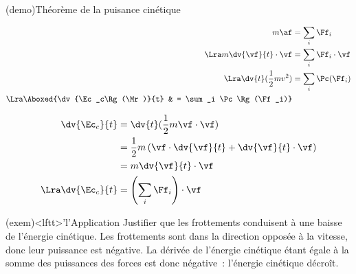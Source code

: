 \documentclass[../../main/main.tex]{subfiles}
\begin{document}
\begin{tcb}[sidebyside](demo){Théorème de la puisance cinétique}
	\begin{center}
	\end{center}
	\vspace*{-15pt}
	\begin{align*}
		m\af                          & = \sum_i \Ff_i
		\\\Lra
		m \dv{\vf}{t}\cdot\vf         & = \sum_i \Ff_i\cdot\vf
		\\\Lra
		\dv{t}(\frac{1}{2}mv^2)       & = \sum_i \Pc(\Ff_i)
		\\\Lra
		\Aboxed{\dv{\Ec_c\Rg(\Mr)}{t} & = \sum_i \Pc\Rg(\Ff_i)}
	\end{align*}
	\tcblower
	\begin{center}
	\end{center}
	\vspace*{-15pt}
	\begin{align*}
		\dv{\Ec_c}{t} & = \dv{t}(\frac{1}{2}m\vf\cdot\vf)
		\\
		              & = \frac{1}{2}m \left( \vf\cdot \dv{\vf}{t} + \dv{\vf}{t}
		\cdot \vf\right)
		\\
		              & = m\dv{\vf}{t}\cdot\vf
		\\\Lra
		\dv{\Ec_c}{t} & = \left( \sum_i \Ff_i \right)\cdot\vf
	\end{align*}
\end{tcb}


\begin{tcb*}(exem)<lftt>'l'{Application}
	Justifier que les frottements conduisent à une baisse de l'énergie
	cinétique.
	\tcblower
	Les frottements sont dans la direction opposée à la vitesse, donc leur
	puissance est négative. La dérivée de l'énergie cinétique étant égale à la
	somme des puissances des forces est donc négative~: l'énergie cinétique
	décroît.
\end{tcb*}
\end{document}
